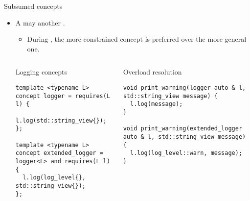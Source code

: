 \begin{frame}[t,fragile]{Subsumed concepts}
\begin{itemize}
  \item A  may  another .
    \begin{itemize}
      \item During , the more constrained
            concept is preferred over the more general one.
    \end{itemize}

\begin{columns}[T]

\begin{block}{Logging concepts}
\begin{lstlisting}[basicstyle=\tiny]
template <typename L>
concept logger = requires(L l) {
  l.log(std::string_view{});
};

template <typename L>
concept extended_logger = logger<L> and requires(L l) {
  l.log(log_level{}, std::string_view{});
};
\end{lstlisting}
\end{block}

\begin{block}{Overload resolution}
\begin{lstlisting}[basicstyle=\tiny]
void print_warning(logger auto & l, std::string_view message) {
  l.log(message);
}

void print_warning(extended_logger auto & l, std::string_view message) {
  l.log(log_level::warn, message);
}
\end{lstlisting}
\end{block}

\end{columns}
\end{itemize}
\end{frame}
